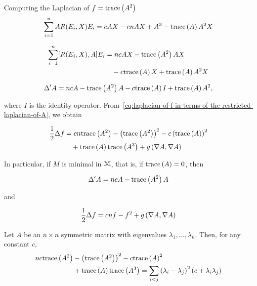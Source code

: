 \begin{frame}[allowframebreaks]{Computing the Laplacian of \(f=\text{trace}\left({A^{2}}\right)\)}
  \[
    \sum_{i=1}^{n}AR(E_{i},X)E_{i}=cAX-cnAX+A^{3}-\text{trace}\left({A}\right)A^{2}X
  \]

  \framebreak

  \begin{align*}
    \sum_{i=1}^{n}[R(E_{i},X),A]E_{i} & =ncAX-\text{trace}\left({A^{2}}\right)AX             \\
                                      & \quad-c\text{trace}\left({A}\right)X+\text{trace}\left({A}\right)A^{2}X
  \end{align*}

  \framebreak

  \begin{equation}\label{eq:restricted-laplacian-of-the-shape-operator}
    \Delta'{A}=ncA-\text{trace}\left({A^{2}}\right)A-c\text{trace}\left({A}\right)I+\text{trace}\left({A}\right)A^{2},
  \end{equation}
  
  where \(I\) is the identity operator.
  From~\eqref{eq:laplacian-of-f-in-terms-of-the-restricted-laplacian-of-A}, we
  obtain

  \begin{equation}\label{eq:final-form-for-the-laplacian-of-f}
    \begin{split}
      \frac{1}{2}\Delta{f} & =cn\text{trace}\left({A^{2}}\right)-\left(\text{trace}\left({A^{2}}\right)\right)^{2}-c\left(\text{trace}\left({A}\right)\right)^{2}   \\
                               & \quad+\text{trace}\left({A}\right)\text{trace}\left({A^{3}}\right)+g\left(\nabla{A},\nabla{A}\right)
    \end{split}
  \end{equation}

  \framebreak

  In particular, if \(M\) is minimal in \(\mathbb{M}\), that is, if
  \(\text{trace}\left({A}\right)=0\), then

  \[
    \Delta'{A}=ncA-\text{trace}\left({A^{2}}\right)A
  \]

  and

  \[
    \frac{1}{2}\Delta{f}=cnf-f^{2}+g\left(\nabla{A},\nabla{A}\right)
  \]
  
  \framebreak

  \begin{lemma}
    Let \(A\) be an \(n\times{n}\) symmetric matrix with eigenvalues
    \(\lambda_{1},\ldots,\lambda_{n}\). Then, for any constant \(c\),
    \begin{align*}
      nc\text{trace}\left({A^{2}}\right)&-\left(\text{trace}\left({A^{2}}\right)\right)^{2}-c\text{trace}\left({A}\right)^{2}                                                                  \\
                     & +\text{trace}\left({A}\right)\text{trace}\left({A^{3}}\right)=\sum_{i<j}\left(\lambda_{i}-\lambda_{j}\right)^{2}\left(c+\lambda_{i}\lambda_{j}\right)
    \end{align*}
  \end{lemma}
  

\end{frame}
